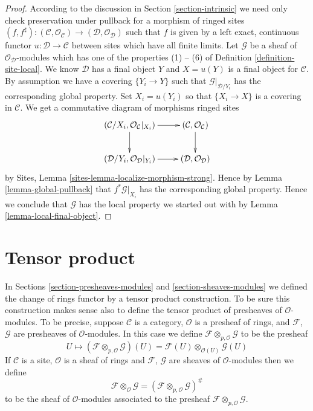 \begin{proof}
According to the discussion in Section \ref{section-intrinsic}
we need only check preservation under pullback for a morphism of ringed sites
$(f, f^\sharp) :
(\mathcal{C}, \mathcal{O}_{\mathcal{C}})
\to
(\mathcal{D}, \mathcal{O}_{\mathcal{D}})$
such that $f$ is given by a left exact, continuous functor
$u : \mathcal{D} \to \mathcal{C}$ between sites which have 
all finite limits.
Let $\mathcal{G}$ be a sheaf of $\mathcal{O}_{\mathcal{D}}$-modules
which has one of the properties (1) -- (6) of
Definition \ref{definition-site-local}.
We know $\mathcal{D}$ has a final object $Y$ and $X = u(Y)$
is a final object for $\mathcal{C}$. By assumption we have
a covering $\{Y_i \to Y\}$ such that $\mathcal{G}|_{\mathcal{D}/Y_i}$
has the corresponding global property. Set $X_i = u(Y_i)$ so
that $\{X_i \to X\}$ is a covering in $\mathcal{C}$.
We get a commutative diagram of morphisms ringed sites
$$
\xymatrix{
(\mathcal{C}/X_i, \mathcal{O}_{\mathcal{C}}|_{X_i}) \ar[r] \ar[d] &
(\mathcal{C}, \mathcal{O}_{\mathcal{C}}) \ar[d] \\
(\mathcal{D}/Y_i, \mathcal{O}_{\mathcal{D}}|_{Y_i}) \ar[r] &
(\mathcal{D}, \mathcal{O}_{\mathcal{D}})
}
$$
by Sites, Lemma \ref{sites-lemma-localize-morphism-strong}.
Hence by Lemma \ref{lemma-global-pullback}
that $f^*\mathcal{G}|_{X_i}$ has the corresponding global
property. Hence we conclude that $\mathcal{G}$ has the local
property we started out with by Lemma \ref{lemma-local-final-object}.
\end{proof}







\section{Tensor product}
\label{section-tensor-product}

\noindent
In Sections \ref{section-presheaves-modules} and
\ref{section-sheaves-modules}
we defined the change of rings functor by a tensor
product construction. To be sure this construction makes sense also
to define the tensor product of presheaves of $\mathcal{O}$-modules.
To be precise, suppose $\mathcal{C}$ is a category,
$\mathcal{O}$ is a presheaf of rings, and $\mathcal{F}$, $\mathcal{G}$
are presheaves of $\mathcal{O}$-modules. In this case we define
$\mathcal{F} \otimes_{p, \mathcal{O}} \mathcal{G}$ to be the presheaf
$$
U
\longmapsto
(\mathcal{F} \otimes_{p, \mathcal{O}} \mathcal{G})(U)
=
\mathcal{F}(U) \otimes_{\mathcal{O}(U)} \mathcal{G}(U)
$$
If $\mathcal{C}$ is a site, $\mathcal{O}$ is a sheaf of rings and
$\mathcal{F}$, $\mathcal{G}$ are sheaves of $\mathcal{O}$-modules
then we define
$$
\mathcal{F} \otimes_{\mathcal{O}} \mathcal{G}
=
(\mathcal{F} \otimes_{p, \mathcal{O}} \mathcal{G})^\#
$$
to be the sheaf of $\mathcal{O}$-modules associated to the presheaf
$\mathcal{F} \otimes_{p, \mathcal{O}} \mathcal{G}$.

